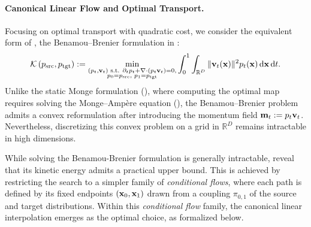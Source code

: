 \paragraph{Canonical Linear Flow and Optimal Transport.}
Focusing on optimal transport with quadratic cost, we consider the equivalent form of , the Benamou--Brenier formulation in :
\begin{equation*}
    \mathcal{K}\left(p_{\mathrm{src}}, p_{\mathrm{tgt}}\right) :=  \min_{\substack{ (p_t, {\mathbf{v}}_t) \text{ s.t. }
        \partial_t p_t + \nabla \cdot (p_t {\mathbf{v}}_t) = 0, \\
        p_0 = p_{\mathrm{src}},\,\, p_1 = p_{\mathrm{tgt}}
    }}
    \int_0^1 \int_{\mathbb{R}^D} \|{\mathbf{v}}_t({\mathbf{x}})\|^2 p_t({\mathbf{x}}) \mathop{}\!\mathrm{d}{\mathbf{x}} \mathop{}\!\mathrm{d} t.
\end{equation*}
Unlike the static Monge formulation (),
where computing the optimal map requires solving the Monge--Amp\`ere
equation (), the Benamou--Brenier problem admits a
convex reformulation after introducing the momentum field
${\mathbf{m}}_t := p_t {\mathbf{v}}_t$. Nevertheless, discretizing this convex problem
on a grid in $\mathbb{R}^D$ remains intractable in high dimensions.




While solving the Benamou-Brenier formulation is generally intractable,  \citet{liu2022rectified,lipman2024flow} reveal that its kinetic energy admits a practical upper bound. This is achieved by restricting the search to a simpler family of \emph{conditional flows}, where each path is defined by its fixed endpoints $({\mathbf{x}}_0, {\mathbf{x}}_1)$ drawn from a coupling $\pi_{0,1}$ of the source and target distributions. Within this \emph{conditional flow} family, the canonical linear interpolation emerges as the optimal choice, as formalized below.

